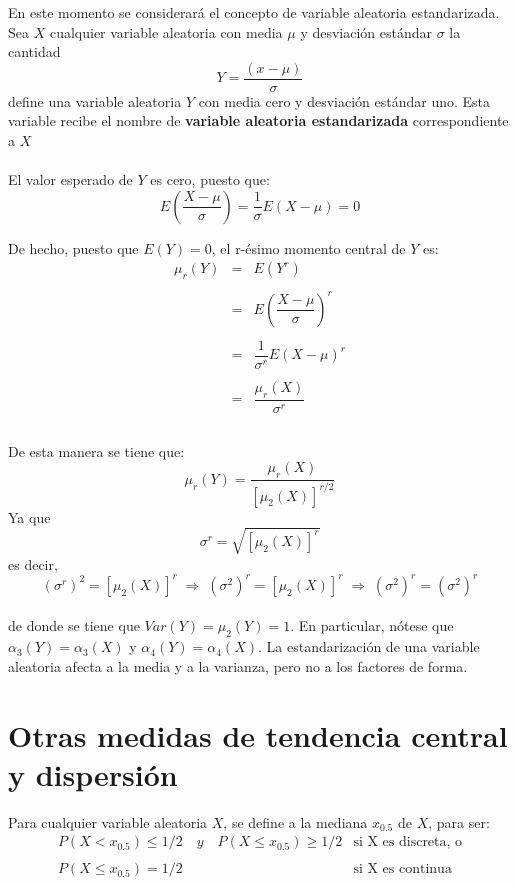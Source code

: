 En este momento se considerará el concepto de variable aleatoria estandarizada. Sea $X$ cualquier variable aleatoria con media $\mu$ y desviación estándar $\sigma$ la cantidad 
$$Y=\dfrac{(x-\mu)}{\sigma}$$
define una variable aleatoria $Y$ con media cero y desviación estándar uno. Esta variable recibe el nombre de \textbf{variable aleatoria estandarizada} correspondiente a $X$\\\\
El valor esperado de $Y$ es cero, puesto que:
$$E\left(\dfrac{X-\mu}{\sigma}\right) = \dfrac{1}{\sigma} E(X-\mu) = 0$$

De hecho, puesto que $E(Y) = 0$, el r-ésimo momento central de $Y$ es:
$$\begin{array}{rcl}
    \mu_r(Y)&=&E(Y^r)\\\\
	    &=&E\left(\dfrac{X-\mu}{\sigma}\right)^r\\\\
	    &=&\dfrac{1}{\sigma^r} E(X-\mu)^r\\\\
	    &=&\dfrac{\mu_r (X)}{\sigma^r}\\\\
\end{array}$$
 
De esta manera se tiene que:
$$\mu_r(Y) = \dfrac{\mu_r(X)}{\left[\mu_2(X)\right]^{r/2}}$$
Ya que $$\sigma^r = \sqrt{\left[\mu_2(X)\right]^r}$$
es decir, $$\left(\sigma^r\right)^2 = \left[\mu_2(X)\right]^r\; \Longrightarrow \; (\sigma^2)^r = \left[\mu_2(X)\right]^r \; \Longrightarrow \; (\sigma^2)^r = (\sigma^2)^r $$\\
de donde se tiene que $Var(Y) = \mu_2(Y) = 1$. En particular, nótese que $\alpha_3(Y) = \alpha_3(X)$ y $\alpha_4(Y) = \alpha_4(X)$. La estandarización de una variable aleatoria afecta a la media y a la varianza, pero no a los factores de forma.


\section{Otras medidas de tendencia central y dispersión}

\begin{tcolorbox}[colframe = white]
    \begin{def.}
	Para cualquier variable aleatoria $X$, se define a la mediana $x_{0.5}$ de $X$, para ser:
	$$\begin{array}{ll}
	    P(X<x_{0.5}) \leq 1/2\quad y \quad P(X\leq x_{0.5}) \geq 1/2&\mbox{si X es discreta, o}\\\\
	    P(X\leq x_{0.5}) = 1/2&\mbox{si X es continua}\\
	\end{array}$$
    \end{def.}
\end{tcolorbox}

